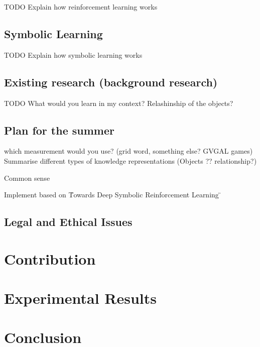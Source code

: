 \documentclass[12pt,twoside]{report}
\begin{document}
TODO Explain how reinforcement learning works

\section{Symbolic Learning}

TODO Explain how symbolic learning works

\section{Existing research (background research)}


TODO What would you learn in my context? Relashinship of the objects?

\section{Plan for the summer}

which measurement would you use? (grid word, something else? GVGAL games)
Summarise different types of knowledge representations (Objects ?? relationship?)

Common sense

Implement based on \"Towards Deep Symbolic Reinforcement Learning \"


\section{Legal and Ethical Issues}



\chapter{Contribution}


\chapter{Experimental Results}


\chapter{Conclusion}



\end{document}
